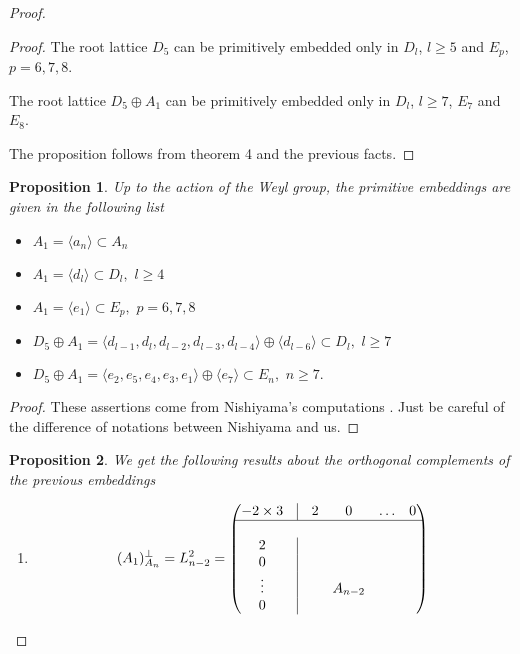 \documentclass{amsart}
\newtheorem{proposition}{Proposition}
\begin{document}
\begin{proof}
\begin{proof}
The root lattice $D_5$ can be primitively embedded only in $D_l$, $l\geq 5$ and $E_p$, $p=6,7,8$.

The root lattice $D_5 \oplus A_1$ can be primitively embedded only in $D_l$, $l\geq 7$, $E_7$ and $E_8$.

The proposition follows from theorem 4 and the previous facts.
\end{proof}

\begin{proposition}
Up to the action of the Weyl group, the primitive embeddings are given in the following list
\begin{itemize}
\item $A_1=\langle a_n \rangle \subset A_n$
\item $A_1= \langle d_l \rangle  \subset D_l, \,\, l\geq 4$
\item $A_1=\langle e_1 \rangle \subset E_p, \, \, p=6,7,8$
\item $D_5\oplus A_1= \langle d_{l-1}, d_l, d_{l-2}, d_{l-3}, d_{l-4} \rangle \oplus \langle d_{l-6} \rangle \subset D_l, \,\, l\geq 7$
\item $D_5 \oplus A_1 =\langle e_2, e_5, e_4, e_3, e_1 \rangle \oplus \langle e_7 \rangle \subset E_n , \,\, n\geq 7.$
\end{itemize}
\end{proposition}

\begin{proof}
These assertions come from Nishiyama's computations \cite{Nis}. Just be careful of the difference of notations between Nishiyama and us.
\end{proof}


\begin{proposition}
We get the following results about the orthogonal complements of the previous embeddings 


\begin{enumerate}

\item
$$(A_1)_{A_n}^{\perp}=L_{n-2}^2=\left ( \begin{matrix}
                                   -2\times 3 & \vline & 2 & 0 & \hdots & 0 \\
                                    \hline \\
                                   2 &\vline & & & & \\
                                    0 & \vline & & & & \\
                                    \vdots & \vline & & A_{n-2} & & \\
                                    0 & \vline & & & & 
                                   \end{matrix} 
                                     \right )$$


\end{enumerate}
\end{proposition}
\end{proof}
\end{document}
